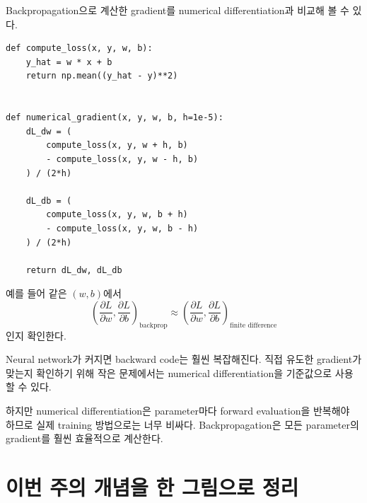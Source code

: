 \documentclass[11pt,a4paper]{article}
\newcommand{\vect}[1]{\bm{#1}}
\newcommand{\T}{^{\mathsf T}}
\begin{document}
Backpropagation으로 계산한 gradient를 numerical differentiation과 비교해 볼 수 있다.

\begin{lstlisting}
def compute_loss(x, y, w, b):
    y_hat = w * x + b
    return np.mean((y_hat - y)**2)


def numerical_gradient(x, y, w, b, h=1e-5):
    dL_dw = (
        compute_loss(x, y, w + h, b)
        - compute_loss(x, y, w - h, b)
    ) / (2*h)

    dL_db = (
        compute_loss(x, y, w, b + h)
        - compute_loss(x, y, w, b - h)
    ) / (2*h)

    return dL_dw, dL_db
\end{lstlisting}

예를 들어 같은 $(w,b)$에서
\[
\left(\frac{\partial L}{\partial w},\frac{\partial L}{\partial b}\right)_{\text{backprop}}
\approx
\left(\frac{\partial L}{\partial w},\frac{\partial L}{\partial b}\right)_{\text{finite difference}}
\]
인지 확인한다.

\begin{remarkbox}
Neural network가 커지면 backward code는 훨씬 복잡해진다. 직접 유도한 gradient가 맞는지 확인하기 위해
작은 문제에서는 numerical differentiation을 기준값으로 사용할 수 있다.

하지만 numerical differentiation은 parameter마다 forward evaluation을 반복해야 하므로 실제 training 방법으로는 너무 비싸다.
Backpropagation은 모든 parameter의 gradient를 훨씬 효율적으로 계산한다.
\end{remarkbox}

\section{이번 주의 개념을 한 그림으로 정리}

\begin{center}
\end{center}
\end{document}
